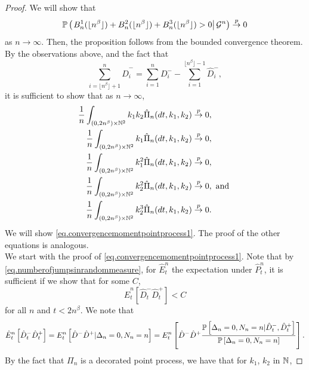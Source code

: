 \begin{proof}
We will show that \begin{equation}\label{eq.conditionalprobanamolousedges}\P\left(\left.B^1_n(\lfloor n^\beta \rfloor)+B^2_n(\lfloor n^\beta \rfloor)+B^3_n(\lfloor n^\beta \rfloor)>0\right| \cG^n \right)\overset{p}{\to}0\end{equation} as $n\to\infty$. Then, the proposition follows from the bounded convergence theorem. By the observations above, and the fact that $$\sum_{i=\lfloor n^\beta \rfloor+1}^n \hat{D}^-_i=\sum_{i=1}^n D^-_i-\sum_{i=1}^{\lfloor n^\beta \rfloor -1}\hat{D}^-_i,$$ it is sufficient to show that as $n\to \infty$,
\begin{align}
\frac{1}{n}\int_{(0,2n^\beta)\times \N^2}k_1k_2\hat{\Pi}_n(dt,k_1,k_2)&\overset{p}{\to}0,\label{eq.convergencemomentpointprocess1}\\
\frac{1}{n}\int_{(0,2n^\beta)\times \N^2}k_1\hat{\Pi}_n(dt,k_1,k_2)&\overset{p}{\to}0,\label{eq.convergencemomentpointprocess2}\\
\frac{1}{n}\int_{(0,2n^\beta)\times \N^2}k_1^2\hat{\Pi}_n(dt,k_1,k_2)&\overset{p}{\to}0,\label{eq.convergencemomentpointprocess3}\\
\frac{1}{n}\int_{(0,2n^\beta)\times \N^2}k_2^2\hat{\Pi}_n(dt,k_1,k_2)&\overset{p}{\to}0,\text{ and }\label{eq.convergencemomentpointprocess4}\\
\frac{1}{n}\int_{(0,2n^\beta)\times \N^2}k_2^3\hat{\Pi}_n(dt,k_1,k_2)&\overset{p}{\to}0.\label{eq.convergencemomentpointprocess5}\end{align}
We will show \ref{eq.convergencemomentpointprocess1}. The proof of the other equations is analogous. \\
We start with the proof of \ref{eq.convergencemomentpointprocess1}. Note that by \eqref{eq.numberofjumpsinrandommeasure}, for $\hat{E}^n_t$ the expectation under $\hat{P}^n_t$, it is sufficient if we show that for some $C$,
\begin{equation}\label{eq.expectationtobound}{\hat{E}}^n_t\left[\hat{D}^-_t\hat{D}^+_t\right]
<C\end{equation}
for all $n$ and $t<2n^\beta$. We note that
$${\hat{E}}^n_t\left[\hat{D}^-_t\hat{D}^+_t\right]={E}^n_t\left[\hat{D}^-\hat{D}^+| \Delta_n=0, N_n=n\right]={E}^n_t\left[\hat{D}^-\hat{D}^+\frac{\P\left[ \Delta_n=0, N_n=n | \hat{D}^-_t,\hat{D}^+_t\right]}{\P\left[ \Delta_n=0, N_n=n\right]}\right].$$
By the fact that $\Pi_n$ is a decorated point process, we have that for $k_1$, $k_2$ in $\N$, 

\end{proof}
